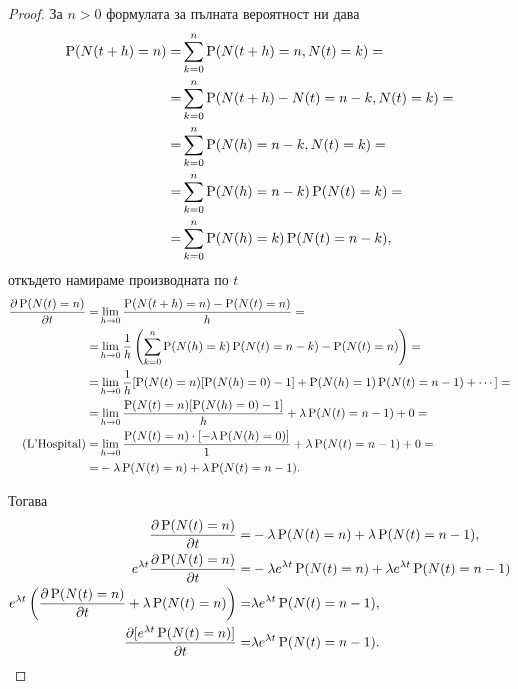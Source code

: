 \documentclass[numbers=endperiod, DIV=15, bibliography=totocnumbered]{scrartcl}
\begin{document}
\begin{proof}
  За $n > 0$ формулата за пълната вероятност ни дава
  \begin{align*}
    \operatorname{P}(N(t+h) = n)
    =&
    \sum_{k=0}^n \operatorname{P}(N(t+h) = n, N(t) = k)
    = \\ =&
    \sum_{k=0}^n \operatorname{P}(N(t+h) - N(t) = n - k, N(t) = k)
    = \\ =&
    \sum_{k=0}^n \operatorname{P}(N(h) = n - k, N(t) = k)
    = \\ =&
    \sum_{k=0}^n \operatorname{P}(N(h) = n - k) \operatorname{P}(N(t) = k)
    = \\ =&
    \sum_{k=0}^n \operatorname{P}(N(h) = k) \operatorname{P}(N(t) = n - k),
  \end{align*}
  откъдето намираме производната по $t$
  \begin{align*}
    \frac {\partial \operatorname{P}(N(t) = n)} {\partial t}
    =&
    \lim_{h \to 0} \frac {\operatorname{P}(N(t+h) = n) - \operatorname{P}(N(t) = n)} h
    = \\ =&
    \lim_{h \to 0} \frac 1 h \left( \sum_{k=0}^n \operatorname{P}(N(h) = k) \operatorname{P}(N(t) = n - k) - \operatorname{P}(N(t) = n) \right)
    = \\ =&
    \lim_{h \to 0} \frac 1 h [\operatorname{P}(N(t) = n) [\operatorname{P}(N(h) = 0) - 1] + \operatorname{P}(N(h) = 1) \operatorname{P}(N(t) = n - 1) + \cdots]
    = \\ =&
    \lim_{h \to 0} \frac {\operatorname{P}(N(t) = n) [\operatorname{P}(N(h) = 0) - 1]} h + \lambda \operatorname{P}(N(t) = n - 1) + 0
    = \\ (\text{L'Hospital}) =&
    \lim_{h \to 0} \frac {\operatorname{P}(N(t) = n) \cdot [-\lambda \operatorname{P}(N(h) = 0)]} 1 + \lambda \operatorname{P}(N(t) = n - 1) + 0
    = \\ =&
    -\lambda \operatorname{P}(N(t) = n) + \lambda \operatorname{P}(N(t) = n - 1).
  \end{align*}

  Тогава
  \begin{align*}
    \frac {\partial \operatorname{P}(N(t) = n)} {\partial t}
    =&
    -\lambda \operatorname{P}(N(t) = n) + \lambda \operatorname{P}(N(t) = n - 1),
    \\
    e^{\lambda t} \frac {\partial \operatorname{P}(N(t) = n)} {\partial t}
    =&
    -\lambda e^{\lambda t} \operatorname{P}(N(t) = n) + \lambda e^{\lambda t} \operatorname{P}(N(t) = n - 1)
    \\
    e^{\lambda t} \left(\frac {\partial \operatorname{P}(N(t) = n)} {\partial t} + \lambda \operatorname{P}(N(t) = n) \right)
    =&
    \lambda e^{\lambda t} \operatorname{P}(N(t) = n - 1),
    \\
    \frac {\partial [e^{\lambda t} \operatorname{P}(N(t) = n)]} {\partial t}
    =&
    \lambda e^{\lambda t} \operatorname{P}(N(t) = n - 1).
  \end{align*}


\end{proof}
\end{document}
